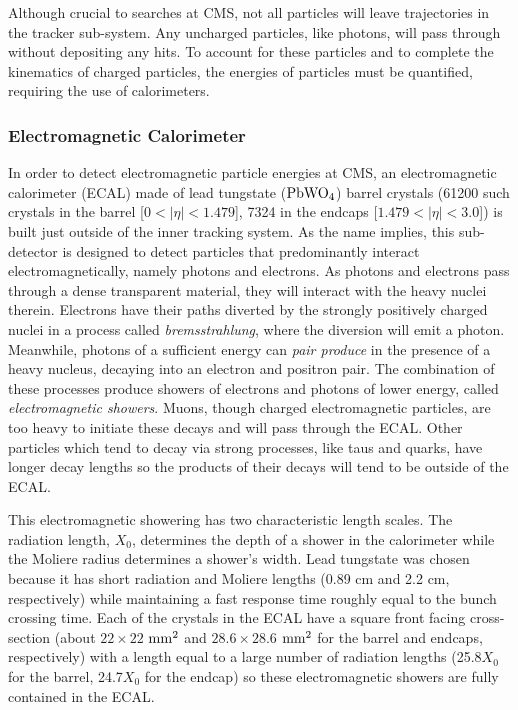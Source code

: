 Although crucial to searches at CMS, not all particles will leave trajectories in the tracker sub-system. Any uncharged particles, like photons, will pass through without depositing any hits. To account for these particles and to complete the kinematics of charged particles, the energies of particles must be quantified, requiring the use of calorimeters.

\subsubsection{Electromagnetic Calorimeter}
\label{sec:ElecCalo}

In order to detect electromagnetic particle energies at CMS, an electromagnetic calorimeter (ECAL) made of lead tungstate ($\rm{PbWO}_4$) barrel crystals (61200 such crystals in the barrel [$0<|\eta|<1.479$], 7324 in the endcaps [$1.479<|\eta|<3.0$]) is built just outside of the inner tracking system. As the name implies, this sub-detector is designed to detect particles that predominantly interact electromagnetically, namely photons and electrons. As photons and electrons pass through a dense transparent material, they will interact with the heavy nuclei therein. Electrons have their paths diverted by the strongly positively charged nuclei in a process called \textit{bremsstrahlung}, where the diversion will emit a photon. Meanwhile, photons of a sufficient energy can \textit{pair produce} in the presence of a heavy nucleus, decaying into an electron and positron pair. The combination of these processes produce showers of electrons and photons of lower energy, called \textit{electromagnetic showers}. Muons, though charged electromagnetic particles, are too heavy to initiate these decays and will pass through the ECAL. Other particles which tend to decay via strong processes, like taus and quarks, have longer decay lengths so the products of their decays will tend to be outside of the ECAL.

This electromagnetic showering has two characteristic length scales. The radiation length, $X_0$, determines the depth of a shower in the calorimeter while the Moliere radius determines a shower's width. Lead tungstate was chosen because it has short radiation and Moliere lengths (0.89 cm and 2.2 cm, respectively) while maintaining a fast response time roughly equal to the bunch crossing time. Each of the crystals in the ECAL have a square front facing cross-section (about $22\times22$ $\rm{mm}^2$ and $28.6\times28.6$ $\rm{mm}^2$ for the barrel and endcaps, respectively) with a length equal to a large number of radiation lengths (25.8$X_0$ for the barrel, 24.7$X_0$ for the endcap) so these electromagnetic showers are fully contained in the ECAL. 

